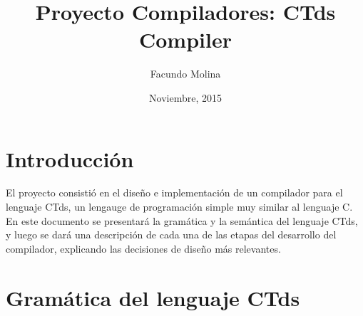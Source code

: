 \documentclass[11pt,a4paper]{article}
\author{Facundo Molina}
\begin{document}
\title{Proyecto Compiladores: CTds Compiler}
\date{Noviembre, 2015}
\maketitle

\section{Introducción}
\label{sec:intro}
El proyecto consistió en el diseño e implementación de un compilador para el lenguaje CTds, un lengauge de programación simple muy similar al lenguaje C.  En este documento se presentará la gramática y la semántica del lenguaje CTds, y luego se dará una descripción de cada una de las etapas del desarrollo del compilador, explicando las decisiones de diseño más relevantes.

\section{Gramática del lenguaje CTds}
\label{sec:gramatica}
\end{document}
